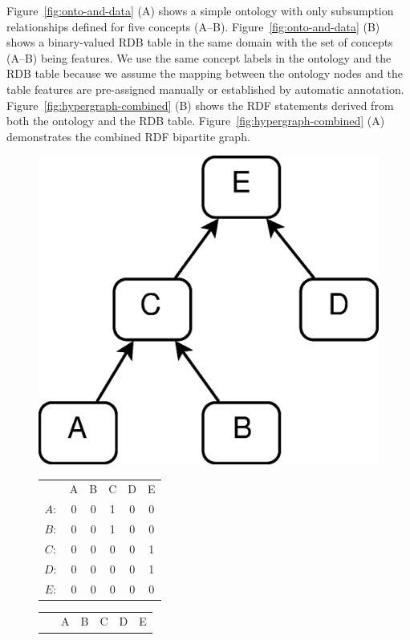 Figure~\ref{fig:onto-and-data} (A) shows a simple ontology with only subsumption relationships defined for five concepts (A--B). Figure~\ref{fig:onto-and-data} (B) shows a binary-valued RDB table in the same domain with the set of concepts (A--B) being features. We use the same concept labels in the ontology and the RDB table because we assume the mapping between the ontology nodes and the table features are pre-assigned manually or established by automatic annotation. Figure~\ref{fig:hypergraph-combined} (B) shows the RDF statements derived from both the ontology and the RDB table. Figure~\ref{fig:hypergraph-combined} (A) demonstrates the combined RDF bipartite graph.

\begin{figure}[tbh]
\begin{minipage}[c]{.4\textwidth}\centering
\includegraphics[width=.5\linewidth]{fig/simple-onto.eps}
\end{minipage}
\begin{minipage}[c]{.25\textwidth}\centering
    \begin{tabular}{ c | c | c | c | c | c |}
    \cline{2-6}
    	~ & A & B & C & D & E\\
    \cline{2-6}
    $A:$& 0 & 0 & 1 & 0 & 0 \\
    \cline{2-6}
    $B:$& 0 & 0 & 1 & 0 & 0 \\
    \cline{2-6}
    $C:$& 0 & 0 & 0 & 0 & 1 \\
    \cline{2-6}
    $D:$& 0 & 0 & 0 & 0 & 1 \\
    \cline{2-6}
    $E:$& 0 & 0 & 0 & 0 & 0 \\
    \cline{2-6}
    \end{tabular}
\end{minipage}
\begin{minipage}[c]{.25\textwidth}\centering
    \begin{tabular}{ c | c | c | c | c | c |}
    \cline{2-6}
    	~ & A & B & C & D & E\\

\end{tabular}
\end{minipage}
\end{figure}
